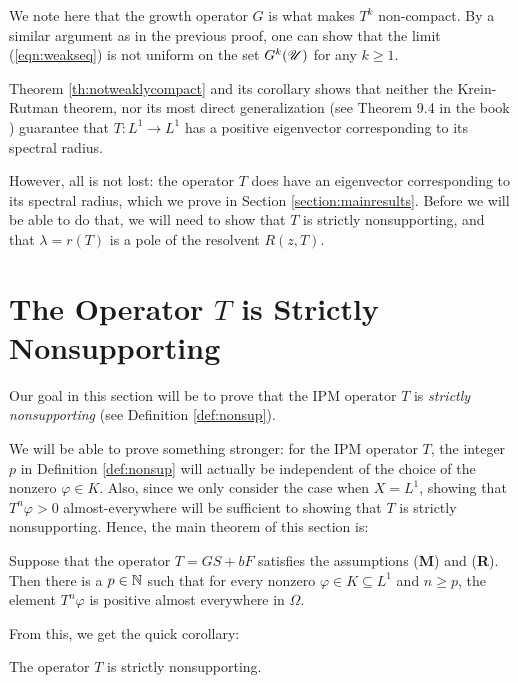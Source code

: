 We note here that the growth operator $G$ is what makes $T^k$ non-compact. By a similar argument as in the previous proof, one can show that the limit (\ref{eqn:weakseq}) is not uniform on the set $G^k(\mathscr U)$ for any $k \geq 1$.

Theorem \ref{th:notweaklycompact} and its corollary shows that neither the Krein-Rutman theorem, nor its most direct generalization (see Theorem 9.4 in the book \cite{Kras1989}) guarantee that $T:L^1 \to L^1$ has a positive eigenvector corresponding to its spectral radius. 

However, all is not lost: the operator $T$ does have an eigenvector corresponding to its spectral radius, which we prove in Section \ref{section:mainresults}. Before we will be able to do that, we will need to show that $T$ is strictly nonsupporting, and that $\lambda = r(T)$ is a pole of the resolvent $R(z, T)$.

\section{The Operator $T$ is Strictly Nonsupporting} \label{section:nonsup}

Our goal in this section will be to prove that the IPM operator $T$ is \emph{strictly nonsupporting} (see Definition \ref{def:nonsup}). 

We will be able to prove something stronger: for the IPM operator $T$, the integer $p$ in Definition \ref{def:nonsup} will actually be independent of the choice of the nonzero $\varphi \in K$. Also, since we only consider the case when $X = L^1$, showing that $T^n\varphi >0$ almost-everywhere will be sufficient to showing that $T$ is strictly nonsupporting. Hence, the main theorem of this section is:

\begin{theorem} \label{th:nonsup}
	Suppose that the operator $T = GS + bF$ satisfies the assumptions (\textbf{M}) and (\textbf{R}). Then there is a $p \in \mathbb{N}$ such that for every nonzero $\varphi \in K \subseteq L^1$ and $n \geq p$, the element $T^n \varphi$ is positive almost everywhere in $\Omega$.
\end{theorem}
From this, we get the quick corollary:
\begin{corollary} \label{th:cortononsup}
	The operator $T$ is strictly nonsupporting.
\end{corollary}

